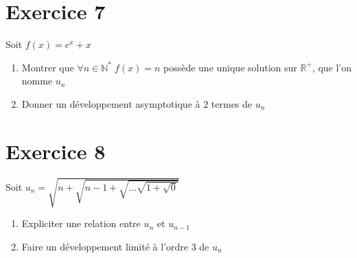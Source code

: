 \documentclass[11pt]{article}
\begin{document}
\section*{Exercice 7}

Soit $f(x)=e^x +x$
\begin{enumerate}
\item Montrer que $\forall n\in\mathbb{N}^{*} \; f(x)=n$ possède une unique solution sur $\mathbb{R}^{+}$, que l'on nomme $u_n$
\item Donner un développement asymptotique à $2$ termes de $u_n$
\end{enumerate}

\section*{Exercice 8}

Soit $u_n=\sqrt{n+\sqrt{n-1+\sqrt{\dots\sqrt{1+\sqrt{0}}}}}$
\begin{enumerate}
\item Expliciter une relation entre $u_n$ et $u_{n-1}$
\item Faire un développement limité à l'ordre $3$ de $u_n$
\end{enumerate}
\end{document}
